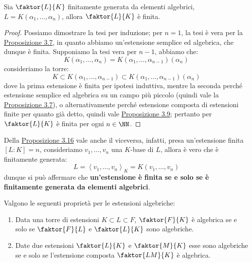 \documentclass[11pt]{scrartcl}
\begin{document}
\begin{proposition}
    \label{3.16}
    Sia $\faktor{L}{K}$ finitamente generata da elementi algebrici, $L = K(\alpha_1,\ldots,\alpha_n)$, allora $\faktor{L}{K}$ è finita.
\end{proposition}

\begin{proof}
    Possiamo dimostrare la tesi per induzione; per $n = 1$, la tesi è vera per la \hyperref[3.7]{Proposizione 3.7}, in quanto abbiamo un'estensione semplice ed algebrica, che dunque è finita. Supponiamo la tesi vera per $n-1$, abbiamo che:
    \[ K(\alpha_1,\ldots,\alpha_n) = K(\alpha_1,\ldots,\alpha_{n-1})(\alpha_n)
        \]
    consideriamo la torre:
    \[ K \subset K(\alpha_1,\ldots,\alpha_{n-1}) \subset K(\alpha_1,\ldots,\alpha_{n-1})(\alpha_n)
        \]
    dove la prima estensione è finita per ipotesi induttiva, mentre la seconda perché estensione semplice ed algebrica su un campo più piccolo (quindi vale la \hyperref[3.7]{Proposizione 3.7}), o alternativamente perché estensione composta di estensioni finite per quanto già detto, 
    quindi vale \hyperref[3.9]{Proposizione 3.9}; pertanto per $\faktor{L}{K}$ è finita per ogni $n \in \NN$.
\end{proof}

\pagebreak
\begin{remark}
    \label{3.17}
    Della \hyperref[3.16]{Proposizione 3.16} vale anche il viceversa, infatti, presa un'estensione finita $[L:K] = n$, consideriamo $v_1,\ldots,v_n$ una $K$-base di $L$, allora 
    è vero che è finitamente generata:
    \[ L = \left<v_1,\ldots,v_n\right>_K = K(v_1,\ldots,v_n)
        \]
    dunque si può affermare che \textbf{un'estensione è finita se e solo se è finitamente generata da elementi algebrici}.
\end{remark}

\begin{proposition}
    Valgono le seguenti proprietà per le estensioni algebriche:
    \begin{enumerate}[(1)]
        \item Data una torre di estensioni $K \subset L \subset F$, $\faktor{F}{K}$ è algebrica se e solo se $\faktor{F}{L}$ e $\faktor{L}{K}$ sono algebriche.
        \item Date due estensioni $\faktor{L}{K}$ e $\faktor{M}{K}$ esse sono algebriche se e solo se l'estensione composta $\faktor{LM}{K}$ è algebrica.
    \end{enumerate}
\end{proposition}
\end{document}
